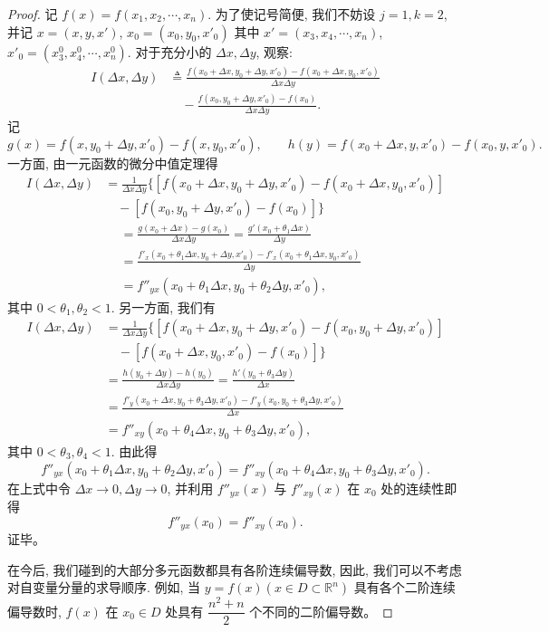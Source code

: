 \documentclass[12pt,fontset=fandol]{ctexart}
\begin{document}
\begin{proof}\quad 记 $f(x)=f(x_1,x_2,\cdots,x_n)$. 为了使记号简便, 我们不妨设 $j=1,k=2$, 并记 $x=(x,y,x')$, $x_0=(x_0,y_0,x'_0)$ 其中 $x'=(x_3,x_4,\cdots,x_n)$, $x'_0=(x_3^0,x_4^0,\cdots,x_n^0)$. 对于充分小的 $\Delta x,\Delta y$, 观察:
\[
\begin{aligned}
  I(\Delta x,\Delta y)
  &\triangleq
  \frac{f(x_0+\Delta x,y_0+\Delta y,x'_0)-f(x_0+\Delta x,y_0,x'_0)}{\Delta x\Delta y}\\
  &\quad-\frac{f(x_0,y_0+\Delta y,x'_0)-f(x_0)}{\Delta x\Delta y}.
\end{aligned}
\]
记
\[
  g(x)=f(x,y_0+\Delta y,x'_0)-f(x,y_0,x'_0),
  \qquad
  h(y)=f(x_0+\Delta x,y,x'_0)-f(x_0,y,x'_0).
\]
一方面, 由一元函数的微分中值定理得
\[
\begin{aligned}
  I(\Delta x,\Delta y)
  &=\frac1{\Delta x\Delta y}
  \{[f(x_0+\Delta x,y_0+\Delta y,x'_0)-f(x_0+\Delta x,y_0,x'_0)]\\
  &\quad-[f(x_0,y_0+\Delta y,x'_0)-f(x_0)]\}
\end{aligned}
\]
\[
\begin{aligned}
  &=\frac{g(x_0+\Delta x)-g(x_0)}{\Delta x\Delta y}
  =\frac{g'(x_0+\theta_1\Delta x)}{\Delta y}\\
  &=\frac{f'_x(x_0+\theta_1\Delta x,y_0+\Delta y,x'_0)
  -f'_x(x_0+\theta_1\Delta x,y_0,x'_0)}{\Delta y}\\
  &=f''_{yx}(x_0+\theta_1\Delta x,y_0+\theta_2\Delta y,x'_0),
\end{aligned}
\]
其中 $0<\theta_1,\theta_2<1$. 另一方面, 我们有
\[
\begin{aligned}
  I(\Delta x,\Delta y)
  &=\frac1{\Delta x\Delta y}
  \{[f(x_0+\Delta x,y_0+\Delta y,x'_0)-f(x_0,y_0+\Delta y,x'_0)]\\
  &\quad-[f(x_0+\Delta x,y_0,x'_0)-f(x_0)]\}\\
  &=\frac{h(y_0+\Delta y)-h(y_0)}{\Delta x\Delta y}
  =\frac{h'(y_0+\theta_3\Delta y)}{\Delta x}\\
  &=\frac{f'_y(x_0+\Delta x,y_0+\theta_3\Delta y,x'_0)
  -f'_y(x_0,y_0+\theta_3\Delta y,x'_0)}{\Delta x}\\
  &=f''_{xy}(x_0+\theta_4\Delta x,y_0+\theta_3\Delta y,x'_0),
\end{aligned}
\]
其中 $0<\theta_3,\theta_4<1$. 由此得
\[
  f''_{yx}(x_0+\theta_1\Delta x,y_0+\theta_2\Delta y,x'_0)
  =f''_{xy}(x_0+\theta_4\Delta x,y_0+\theta_3\Delta y,x'_0).
\]
在上式中令 $\Delta x\to0,\Delta y\to0$, 并利用 $f''_{yx}(x)$ 与 $f''_{xy}(x)$ 在 $x_0$ 处的连续性即得
\[
  f''_{yx}(x_0)=f''_{xy}(x_0).
\]
证毕。

在今后, 我们碰到的大部分多元函数都具有各阶连续偏导数, 因此, 我们可以不考虑对自变量分量的求导顺序. 例如, 当 $y=f(x)(x\in D\subset\mathbb R^n)$ 具有各个二阶连续偏导数时, $f(x)$ 在 $x_0\in D$ 处具有 $\dfrac{n^2+n}{2}$ 个不同的二阶偏导数。

\end{proof}
\end{document}
